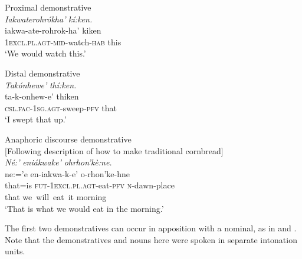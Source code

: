 \documentclass[output=paper]{langscibook}
\begin{document}
\ea%
    \label{ex:mithun:2}
    Proximal demonstrative\\
    \glll \textit{Iakwaterohrókha’}            \textit{kí:ken.}\\
 iakwa-ate-rohrok-ha’          kiken\\
    \textsc{1excl.pl.agt-mid-}watch-\textsc{hab}  this\\
    \glt ‘We would watch this.’\\
\z

\ea%
    \label{ex:mithun:3}
    Distal demonstrative\\
    \glll \textit{Takónhewe’}                  \textit{thí:ken.}\\
    ta-k-onhew-e’                thiken\\
    \textsc{csl.fac-1sg.agt-}sweep-\textsc{pfv}    that\\
    \glt ‘I swept that up.’\\
\z

\ea%
    \label{ex:mithun:4}
    Anaphoric discourse demonstrative\\
    {[}Following description of how to make traditional cornbread]\\
    \gllll \textit{Né:’}     \textit{eniákwake’}                \textit{ohrhon’kè:ne.}\\
    ne:=’e    en-iakwa-k-e’              o-rhon’ke-hne\\
    that=is  \textsc{fut-1excl.pl.agt}{}-eat-\textsc{pfv}    \textsc{n}{}-dawn-place\\
    that      {we~will~eat~it}                morning\\
    \glt ‘That is what we would eat in the morning.’\\
\z

The first two demonstratives can occur in apposition with a nominal, as in  and . Note that the demonstratives and nouns here were spoken in separate intonation units.
\end{document}
